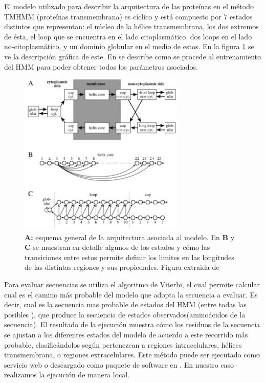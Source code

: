 El modelo utilizado para describir la arquitectura de las proteínas en el método TMHMM (proteínas transmembrana) es cíclico y está compuesto por 7 estados distintos que representan: el núcleo de la hélice transmembrana, los dos extremos de ésta, 
el loop que se encuentra en el lado citoplasmático, dos loops en el lado no-citoplasmático, y un dominio globular en el medio de estos. En la figura \ref{tmhmmModel} se ve la descripción gráfica de este.
En \cite{sonnhammer1998hidden} se describe como se procede al entrenamiento del HMM para poder obtener todos los parámetros asociados.


\begin{figure}[h!,centered]
\centering
\includegraphics[width=0.7\textwidth]{img/tmhmmModel.png} 
\caption{\textbf{A:} esquema general de la arquitectura asociada al modelo. En \textbf{B} y \textbf{C} se muestran en detalle algunos de los estados y cómo las
transiciones entre estos permite definir los limites en las longitudes de las distintas regiones y sus propiedades. Figura extraida de \cite{sonnhammer1998hidden}}
\label{tmhmmModel}
\end{figure}


Para evaluar secuencias se utiliza el algoritmo de Viterbi, el cual permite calcular cual es el camino más probable del modelo que adopta la secuencia a evaluar. Es decir, cual es la secuencia mas probable de estados del HMM 
(entre todas las posibles ), que produce la secuencia de estados observados(aminoácidos de la secuencia).
El resultado de la ejecución muestra cómo los residuos de la secuencia se ajustan a los diferentes estados del modelo de acuerdo a este recorrido más probable, clasificándolos según pertenezcan a regiones intracelulares, hélices transmembrana, 
o regiones extracelulares. 
Este método puede ser ejecutado como servicio web o descargado como paquete de software en \cite{tmhmmServer}.
En nuestro caso realizamos la ejecución de manera local.

